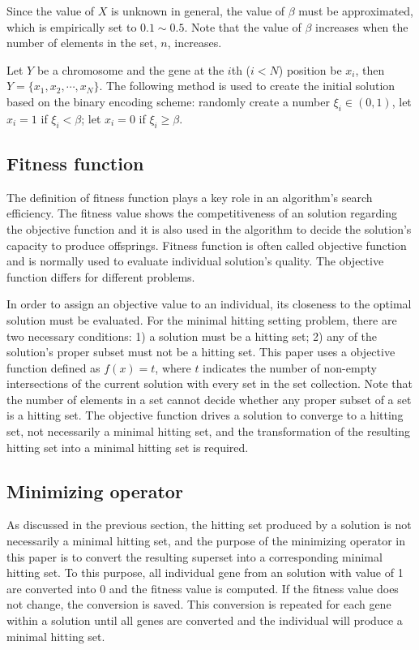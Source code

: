 Since the value of $X$ is unknown in general, the value of $\beta$ must be approximated, which is empirically set to $0.1 \sim 0.5$.
Note that the value of $\beta$ increases when the number of elements in the set, $n$, increases.

Let $Y$ be a chromosome and the gene at the $i$th ($i < N$) position be $x_i$, then $Y = \{x_1, x_2, \cdots, x_N\}$.
The following method is used to create the initial solution based on the binary encoding scheme:
randomly create a number $\xi_i \in (0, 1)$, let $x_i = 1$ if $\xi_i < \beta$; let $x_i = 0$ if $\xi_i \geq \beta$.

\subsection{Fitness function}
The definition of fitness function plays a key role in an algorithm's search efficiency.
The fitness value shows the competitiveness of an solution regarding the objective function and it is also used in the algorithm to decide the solution's capacity to produce offsprings.
Fitness function is often called objective function and is normally used to evaluate individual solution's quality.
The objective function differs for different problems.

In order to assign an objective value to an individual, its closeness to the optimal solution must be evaluated.
For the minimal hitting setting problem, there are two necessary conditions: 1) a solution must be a hitting set; 2) any of the solution's proper subset must not be a hitting set.
This paper uses a objective function defined as $f(x) = t$, where $t$ indicates the number of non-empty intersections of the current solution with every set in the set collection.
Note that the number of elements in a set cannot decide whether any proper subset of a set is a hitting set.
The objective function drives a solution to converge to a hitting set, not necessarily a minimal hitting set, and the transformation of the resulting hitting set into a minimal hitting set is required.



\subsection{Minimizing operator}
As discussed in the previous section, the hitting set produced by a solution is not necessarily a minimal hitting set, and the purpose of the minimizing operator in this paper is to convert the resulting superset into a corresponding minimal hitting set.
To this purpose, all individual gene from an solution with value of 1 are converted into 0 and the fitness value is computed.
If the fitness value does not change, the conversion is saved.
This conversion is repeated for each gene within a solution until all genes are converted and the individual will produce a minimal hitting set.

